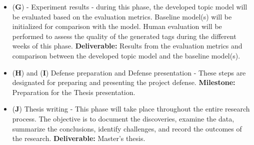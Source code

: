 \documentclass{article}
\begin{document}
\begin{itemize}
    \item (\textbf{G}) - Experiment results - during this phase, the developed topic model will be evaluated based on the evaluation metrics. Baseline model(s) will be initialized for comparison with the model. Human evaluation will be performed to assess the quality of the generated tags during the different weeks of this phase. \textbf{Deliverable:} Results from the evaluation metrics and comparison between the developed topic model and the baseline model(s).

    \item (\textbf{H}) and (\textbf{I}) Defense preparation and Defense presentation - These steps are designated for preparing and presenting the project defense. \textbf{Milestone:} Preparation for the Thesis presentation.

    \item (\textbf{J}) Thesis writing - This phase will take place throughout the entire research process. The objective is to document the discoveries, examine the data, summarize the conclusions, identify challenges, and record the outcomes of the research. \textbf{Deliverable:} Master’s thesis.
\end{itemize}
\end{document}
